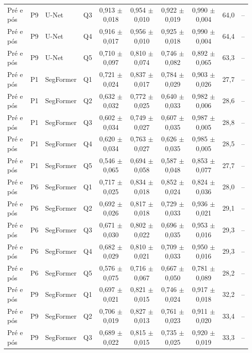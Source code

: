 {\begin{longtable}{llllcccccc}
Pré e pós & P9 & U-Net & Q3 & 0,913 $\pm$ 0,018 & 0,954 $\pm$ 0,010 & 0,922 $\pm$ 0,019 & 0,990 $\pm$ 0,004 & 64,0 & -- \\
Pré e pós & P9 & U-Net & Q4 & 0,916 $\pm$ 0,017 & 0,956 $\pm$ 0,010 & 0,925 $\pm$ 0,018 & 0,990 $\pm$ 0,004 & 64,4 & -- \\
Pré e pós & P9 & U-Net & Q5 & 0,710 $\pm$ 0,097 & 0,810 $\pm$ 0,074 & 0,746 $\pm$ 0,082 & 0,892 $\pm$ 0,065 & 63,3 & -- \\
Pré e pós & P1 & SegFormer & Q1 & 0,721 $\pm$ 0,024 & 0,837 $\pm$ 0,017 & 0,784 $\pm$ 0,029 & 0,903 $\pm$ 0,026 & 27,7 & -- \\
Pré e pós & P1 & SegFormer & Q2 & 0,632 $\pm$ 0,032 & 0,772 $\pm$ 0,025 & 0,640 $\pm$ 0,033 & 0,982 $\pm$ 0,006 & 28,6 & -- \\
Pré e pós & P1 & SegFormer & Q3 & 0,602 $\pm$ 0,034 & 0,749 $\pm$ 0,027 & 0,607 $\pm$ 0,035 & 0,987 $\pm$ 0,005 & 28,8 & -- \\
Pré e pós & P1 & SegFormer & Q4 & 0,620 $\pm$ 0,034 & 0,763 $\pm$ 0,027 & 0,626 $\pm$ 0,035 & 0,985 $\pm$ 0,005 & 28,5 & -- \\
Pré e pós & P1 & SegFormer & Q5 & 0,546 $\pm$ 0,065 & 0,694 $\pm$ 0,058 & 0,587 $\pm$ 0,048 & 0,853 $\pm$ 0,077 & 27,7 & -- \\
Pré e pós & P6 & SegFormer & Q1 & 0,717 $\pm$ 0,025 & 0,834 $\pm$ 0,018 & 0,852 $\pm$ 0,024 & 0,824 $\pm$ 0,036 & 28,0 & -- \\
Pré e pós & P6 & SegFormer & Q2 & 0,692 $\pm$ 0,026 & 0,817 $\pm$ 0,018 & 0,729 $\pm$ 0,033 & 0,936 $\pm$ 0,021 & 29,1 & -- \\
Pré e pós & P6 & SegFormer & Q3 & 0,671 $\pm$ 0,030 & 0,802 $\pm$ 0,022 & 0,696 $\pm$ 0,035 & 0,953 $\pm$ 0,016 & 29,3 & -- \\
Pré e pós & P6 & SegFormer & Q4 & 0,682 $\pm$ 0,029 & 0,810 $\pm$ 0,021 & 0,709 $\pm$ 0,033 & 0,950 $\pm$ 0,016 & 29,3 & -- \\
Pré e pós & P6 & SegFormer & Q5 & 0,576 $\pm$ 0,075 & 0,716 $\pm$ 0,067 & 0,667 $\pm$ 0,050 & 0,781 $\pm$ 0,089 & 28,2 & -- \\
Pré e pós & P9 & SegFormer & Q1 & 0,697 $\pm$ 0,021 & 0,821 $\pm$ 0,015 & 0,746 $\pm$ 0,024 & 0,917 $\pm$ 0,018 & 32,2 & -- \\
Pré e pós & P9 & SegFormer & Q2 & 0,706 $\pm$ 0,019 & 0,827 $\pm$ 0,013 & 0,761 $\pm$ 0,023 & 0,911 $\pm$ 0,020 & 33,4 & -- \\
Pré e pós & P9 & SegFormer & Q3 & 0,689 $\pm$ 0,022 & 0,815 $\pm$ 0,015 & 0,735 $\pm$ 0,025 & 0,920 $\pm$ 0,019 & 33,3 & -- \\

\end{longtable}}
